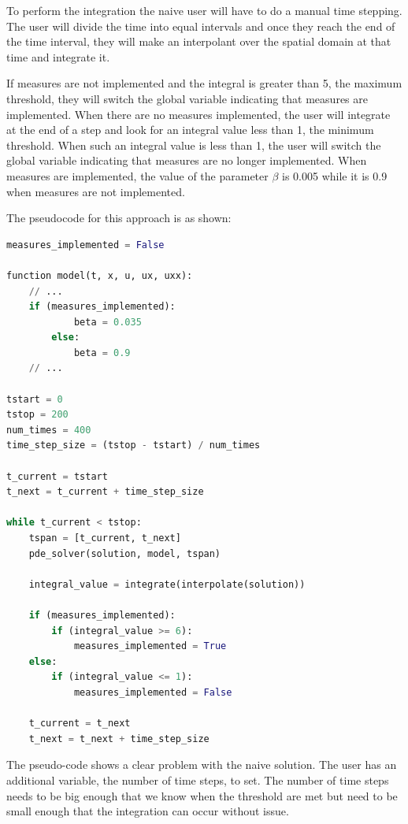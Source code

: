 \documentclass{article}
\begin{document}
To perform the integration the naive user will have to do a manual time stepping. The user will divide the time into equal intervals and once they reach the end of the time interval, they will make an interpolant over the spatial domain at that time and integrate it. 

If measures are not implemented and the integral is greater than 5, the maximum threshold, they will switch the global variable indicating that measures are implemented. When there are no measures implemented, the user will integrate at the end of a step and look for an integral value less than 1, the minimum threshold. When such an integral value is less than 1, the user will switch the global variable indicating that measures are no longer implemented. When measures are implemented, the value of the parameter $\beta$ is 0.005 while it is 0.9 when measures are not implemented. 

The pseudocode for this approach is as shown:

\begin{minipage}{\linewidth}
\begin{lstlisting}[language=Python]
measures_implemented = False

function model(t, x, u, ux, uxx):
    // ...
    if (measures_implemented):
    		beta = 0.035
    	else:
    		beta = 0.9
    // ...

tstart = 0
tstop = 200
num_times = 400
time_step_size = (tstop - tstart) / num_times
		
t_current = tstart
t_next = t_current + time_step_size

while t_current < tstop:
	tspan = [t_current, t_next]
	pde_solver(solution, model, tspan)
	
	integral_value = integrate(interpolate(solution))
	
	if (measures_implemented):
		if (integral_value >= 6):
			measures_implemented = True
	else:
		if (integral_value <= 1):
			measures_implemented = False
	
	t_current = t_next
	t_next = t_next + time_step_size
\end{lstlisting}
\end{minipage}

The pseudo-code shows a clear problem with the naive solution. The user has an additional variable, the number of time steps, to set. The number of time steps needs to be big enough that we know when the threshold are met but need to be small enough that the integration can occur without issue. 
\end{document}
